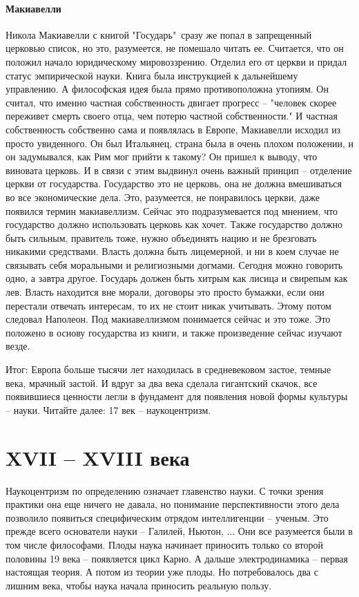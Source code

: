 \documentclass[a4paper, 12pt]{article}
\begin{document}
\paragraph{Макиавелли} Никола Макиавелли с книгой "Государь"\ сразу же попал в запрещенный церковью список, но это, разумеется, не помешало читать ее. Считается, что он положил начало юридическому мировоззрению. Отделил его от церкви и придал статус эмпирической науки. Книга была инструкцией к дальнейшему управлению. А философская идея была прямо противоположна утопиям. Он считал, что именно частная собственность двигает прогресс -- "человек скорее переживет смерть своего отца, чем потерю частной собственности." И частная собственность собственно сама и появлялась в Европе, Макиавелли исходил из просто увиденного. Он был Итальянец, страна была в очень плохом положении, и он задумывался, как Рим мог прийти к такому? Он пришел к выводу, что виновата церковь. И в связи с этим выдвинул очень важный принцип -- отделение церкви от государства. Государство это не церковь, она не должна вмешиваться во все экономические дела. Это, разумеется, не понравилось церкви, даже появился термин макиавеллизм. Сейчас это подразумевается под мнением, что государство должно использовать церковь как хочет. Также государство должно быть сильным, правитель тоже, нужно объединять нацию и не брезговать никакими средствами. Власть должна быть лицемерной, и ни в коем случае не связывать себя моральными и религиозными догмами. Сегодня можно говорить одно, а завтра другое. Государь должен быть хитрым как лисица и свирепым как лев. Власть находится вне морали, договоры это просто бумажки, если они перестали отвечать интересам, то их не стоит никак учитывать. Этому потом следовал Наполеон. Под макиавеллизмом понимается сейчас и это тоже. Это положено в основу государства из книги, и также произведение сейчас изучают везде. 

Итог: Европа больше тысячи лет находилась в средневековом застое, темные века, мрачный застой. И вдруг за два века сделала гигантский скачок, все появившиеся ценности легли в фундамент для появления новой формы культуры -- науки. Читайте далее: 17 век -- наукоцентризм. 

\section{XVII -- XVIII века}

Наукоцентризм по определению означает главенство науки. С точки зрения практики она еще ничего не давала, но понимание перспективности этого дела позволило появиться специфическим отрядом интеллигенции -- ученым. Это прежде всего основатели науки -- Галилей, Ньютон, ... Они все разумеется были в том числе философами. Плоды наука начинает приносить только со второй половины 19 века -- появляется цикл Карно. А дальше электродинамика -- первая настоящая теория. А потом из теории уже плоды. Но потребовалось два с лишним века, чтобы наука начала приносить реальную пользу. 
\end{document}
